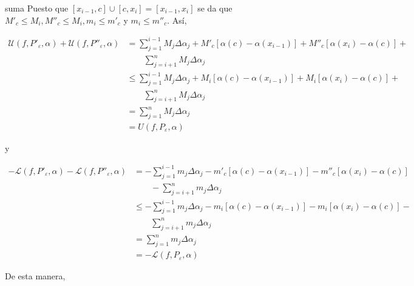 \documentclass[12pt]{article}
\newenvironment{ejercicio}[1]{\begin{ejer}[breakable, pad at break = 5mm, leftrule = 0.7mm, rightrule = 0.7mm, right = 2mm, left = 2mm, enlarge bottom finally by = 3mm, fontlower = \setlength{\parskip}{2mm}]{}{#1}}{\end{ejer}}
\begin{document}
\begin{ejercicio}{suma}
		Puesto que $ \left[ x_{i-1}, c \right] \cup \left[ c, x_i \right] = \left[ x_{i-1}, x_i \right] $ se da que $ M'_c \leq M_i, M''_c \leq M_i, m_i \leq m'_c $ y $ m_i \leq m''_c $. Así,

		\begin{align*}
			\mathcal{U} \left( f, P'_\varepsilon, \alpha \right) + \mathcal{U} \left( f, P''_\varepsilon, \alpha \right) &= \sum_{j=1}^{i-1} M_j \Delta \alpha_j + M'_c \left[ \alpha(c) - \alpha\left( x_{i-1} \right) \right] + M''_c \left[ \alpha(x_i) - \alpha\left( c \right) \right] + \\
			& \qquad \sum_{j=i+1}^{n} M_j \Delta \alpha_j \\
			&\leq \sum_{j=1}^{i-1} M_j \Delta \alpha_j + M_i \left[ \alpha(c) - \alpha\left( x_{i-1} \right) \right] + M_i \left[ \alpha(x_i) - \alpha\left( c \right) \right] + \\
			& \qquad \sum_{j=i+1}^{n} M_j \Delta \alpha_j \\
			&= \sum_{j=1}^{n} M_j \Delta \alpha_j \\
			&= U(f,P_\varepsilon,\alpha)
		\end{align*}
		
		y

		\begin{align*}
			- \mathcal{L} \left( f, P'_\varepsilon, \alpha \right) - \mathcal{L} \left( f, P''_\varepsilon, \alpha \right) &= - \sum_{j=1}^{i-1} m_j \Delta \alpha_j - m'_c \left[ \alpha(c) - \alpha\left( x_{i-1} \right) \right] - m''_c \left[ \alpha(x_i) - \alpha\left( c \right) \right]  \\
			& \qquad - \sum_{j=i+1}^{n} m_j \Delta \alpha_j \\
			&\leq - \sum_{j=1}^{i-1} m_j \Delta \alpha_j - m_i \left[ \alpha(c) - \alpha\left( x_{i-1} \right) \right] - m_i \left[ \alpha(x_i) - \alpha\left( c \right) \right] - \\
			& \qquad\sum_{j=i+1}^{n} m_j \Delta \alpha_j \\
			&= \sum_{j=1}^{n} m_j \Delta \alpha_j \\
			&= -\mathcal{L} (f,P_\varepsilon,\alpha)
		\end{align*}

		De esta manera, 
		

\end{ejercicio}
\end{document}
